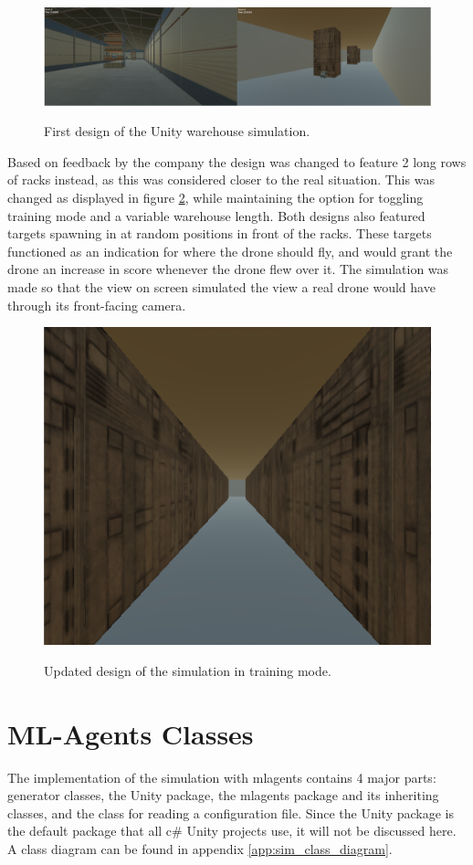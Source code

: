 \begin{figure}[h]
	\centering
	\includegraphics[width=\linewidth]{img/unity_real_training}
	\label{fig:first_sim}
	\caption{First design of the Unity warehouse simulation.}
\end{figure}

Based on feedback by the company the design was changed to feature 2 long rows of racks instead, as this was considered closer to the real situation. This was changed as displayed in figure \ref{fig:second_sim}, while maintaining the option for toggling training mode and a variable warehouse length. Both designs also featured targets spawning in at random positions in front of the racks. These targets functioned as an indication for where the drone should fly, and would grant the drone an increase in score whenever the drone flew over it. The simulation was made so that the view on screen simulated the view a real drone would have through its front-facing camera.

\begin{figure}[h]
	\centering
	\includegraphics[width=0.5\linewidth]{img/sim_reinforcement}
	\label{fig:second_sim}
	\caption{Updated design of the simulation in training mode.}
\end{figure}

\section{ML-Agents Classes }
The implementation of the simulation with \gls{mlagents} contains 4 major parts: generator classes, the Unity package, the \gls{mlagents} package and its inheriting classes, and the class for reading a configuration file. Since the Unity package is the default package that all c\# Unity projects use, it will not be discussed here. A class diagram can be found in appendix \ref{app:sim_class_diagram}.


